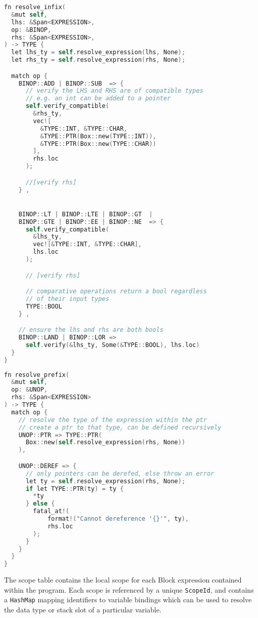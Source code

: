 \begin{lstlisting}[language=C]
fn resolve_infix(
  &mut self,
  lhs: &Span<EXPRESSION>,
  op: &BINOP,
  rhs: &Span<EXPRESSION>,
) -> TYPE {
  let lhs_ty = self.resolve_expression(lhs, None);
  let rhs_ty = self.resolve_expression(rhs, None);

  match op {
    BINOP::ADD | BINOP::SUB  => { 
      // verify the LHS and RHS are of compatible types 
      // e.g. an int can be added to a pointer 
      self.verify_compatible(
        &rhs_ty, 
        vec![
          &TYPE::INT, &TYPE::CHAR, 
          &TYPE::PTR(Box::new(TYPE::INT)), 
          &TYPE::PTR(Box::new(TYPE::CHAR)) 
        ], 
        rhs.loc
      );

      //[verify rhs]
    } ,


    BINOP::LT | BINOP::LTE | BINOP::GT  | 
    BINOP::GTE | BINOP::EE | BINOP::NE  => { 
      self.verify_compatible(
        &lhs_ty, 
        vec![&TYPE::INT, &TYPE::CHAR], 
        lhs.loc
      );

      // [verify rhs]

      // comparative operations return a bool regardless 
      // of their input types
      TYPE::BOOL
    } ,

    // ensure the lhs and rhs are both bools
    BINOP::LAND | BINOP::LOR => 
      self.verify(&lhs_ty, Some(&TYPE::BOOL), lhs.loc)
  }
}
\end{lstlisting}

\begin{lstlisting}[language=C]
fn resolve_prefix(
  &mut self, 
  op: &UNOP, 
  rhs: &Span<EXPRESSION>
) -> TYPE {
  match op {
    // resolve the type of the expression within the ptr 
    // create a ptr to that type, can be defined recursively
    UNOP::PTR => TYPE::PTR(
      Box::new(self.resolve_expression(rhs, None))
    ),

    UNOP::DEREF => {
      // only pointers can be derefed, else throw an error
      let ty = self.resolve_expression(rhs, None);
      if let TYPE::PTR(ty) = ty {
        *ty
      } else {
        fatal_at!(
            format!("Cannot dereference '{}'", ty),
            rhs.loc
        );
      }
    }
  }
} 
\end{lstlisting}

The scope table contains the local scope for each Block expression contained within the program. Each scope is referenced by a unique \texttt{ScopeId}, and contains a \texttt{HashMap} mapping identifiers to variable bindings which can be used to resolve the data type or stack slot of a particular variable. 

